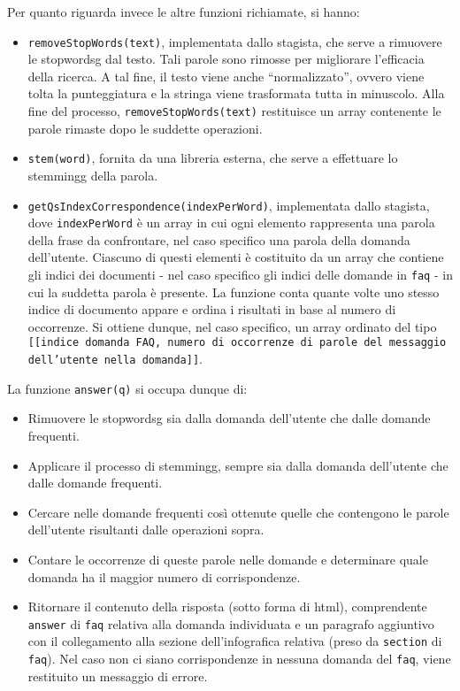 \noindent Per quanto riguarda invece le altre funzioni richiamate, si hanno:
\begin{itemize}
    \item \texttt{removeStopWords(text)}, implementata dallo stagista, che serve a rimuovere le \gls{stopwordsg} dal testo. 
    Tali parole sono rimosse per migliorare l'efficacia della ricerca. A tal fine, il testo viene anche ``normalizzato'', ovvero viene
    tolta la punteggiatura e la stringa viene trasformata tutta in minuscolo.
    Alla fine del processo, \texttt{removeStopWords(text)} restituisce un array contenente le parole rimaste dopo le suddette operazioni.
    \item \texttt{stem(word)}, fornita da una libreria esterna, che serve a effettuare lo \gls{stemmingg} della parola.
    \item \texttt{getQsIndexCorrespondence(indexPerWord)}, implementata dallo stagista, dove \texttt{indexPerWord} è un array in cui ogni elemento rappresenta 
    una parola della frase da confrontare, nel caso specifico una parola della domanda dell'utente. Ciascuno di questi elementi è costituito da un array 
    che contiene gli indici dei documenti - nel caso specifico gli indici delle domande in \texttt{faq} - in cui la suddetta parola è presente.
    La funzione conta quante volte uno stesso indice di documento appare e ordina i risultati in base al numero di occorrenze. Si ottiene dunque, nel caso specifico, 
    un array ordinato del tipo \texttt{[[indice domanda FAQ, numero di occorrenze di parole del messaggio dell'utente nella domanda]]}. 
\end{itemize}
La funzione \texttt{answer(q)} si occupa dunque di:
\begin{itemize}
    \item Rimuovere le \gls{stopwordsg} sia dalla domanda dell'utente che dalle domande frequenti.
    \item Applicare il processo di \gls{stemmingg}, sempre sia dalla domanda dell'utente che dalle domande frequenti.
    \item Cercare nelle domande frequenti così ottenute quelle che contengono le parole dell'utente risultanti dalle operazioni sopra.
    \item Contare le occorrenze di queste parole nelle domande e determinare quale domanda ha il maggior numero di corrispondenze.
    \item Ritornare il contenuto della risposta (sotto forma di \gls{html}), comprendente \texttt{answer} di \texttt{faq} relativa 
    alla domanda individuata e un paragrafo aggiuntivo con il collegamento alla sezione dell'infografica relativa (preso da \texttt{section} di \texttt{faq}).
    Nel caso non ci siano corrispondenze in nessuna domanda del \texttt{faq}, viene restituito un messaggio di errore.
\end{itemize}

